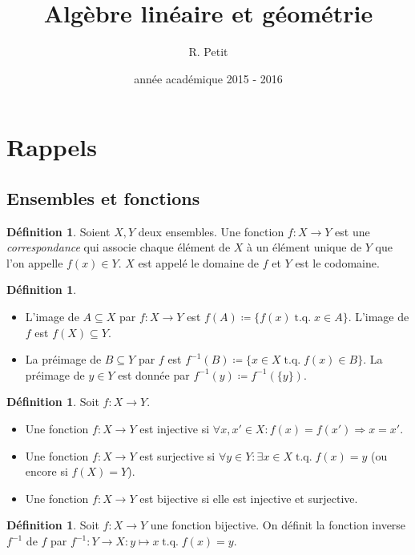 \documentclass{article}
\title{Algèbre linéaire et géométrie}
\author{R. Petit}
\date{année académique 2015 - 2016}
\DeclareMathOperator{\tq}{\text{ t.q. }}
\theoremstyle{definition}
\newtheorem{déf}[thm]{Définition}
\theoremstyle{remark}
\begin{document}
\maketitle
\tableofcontents
\newpage
{}

\section{Rappels}
	\subsection{Ensembles et fonctions}
		\begin{déf} Soient $X, Y$ deux ensembles. Une fonction $f : X \to Y$ est une \textit{correspondance} qui associe chaque élément de $X$ à un élément unique de $Y$
		que l'on appelle $f(x) \in Y$. $X$ est appelé le domaine de $f$ et $Y$ est le codomaine. \end{déf}

		\begin{déf}~
		\begin{itemize}
			\item L'image de $A \subseteq X$ par $f : X \to Y$ est $f(A) \coloneqq \{f(x) \tq x \in A\}$. L'image de $f$ est $f(X) \subseteq Y$.
			\item La préimage de $B \subseteq Y$ par $f$ est $f^{-1}(B) \coloneqq \{x \in X \tq f(x) \in B\}$. La préimage de $y \in Y$ est donnée par
			      $f^{-1}(y) \coloneqq f^{-1}(\{y\})$.
		\end{itemize}
		\end{déf}

		\begin{déf} Soit $f : X \to Y$.
		\begin{itemize}
			\item Une fonction $f : X \to Y$ est injective si $\forall x, x' \in X : f(x) = f(x') \Rightarrow x = x'$.
			\item Une fonction $f : X \to Y$ est surjective si $\forall y \in Y : \exists x \in X \tq f(x) = y$ (ou encore si $f(X) = Y$).
			\item Une fonction $f : X \to Y$ est bijective si elle est injective et surjective.
		\end{itemize}
		\end{déf}

		\begin{déf} Soit $f : X \to Y$ une fonction bijective. On définit la fonction inverse $f^{-1}$ de $f$ par $f^{-1} : Y \to X : y \mapsto x \tq f(x) = y$. \end{déf}
\end{document}
